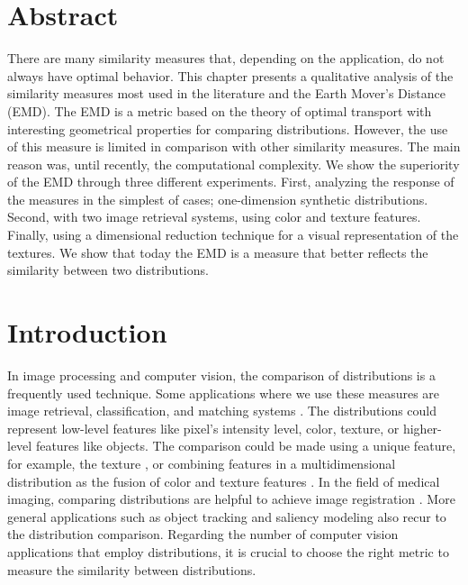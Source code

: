 \section*{Abstract}
\noindent There are many similarity measures that, depending on the application, do not always have optimal behavior. This chapter presents a qualitative analysis of the similarity measures most used in the literature and the Earth Mover's Distance (EMD). The EMD is a metric based on the theory of optimal transport with interesting geometrical properties for comparing distributions. However, the use of this measure is limited in comparison with other similarity measures. The main reason was, until recently, the computational complexity. We show the superiority of the EMD through three different experiments. First, analyzing the response of the measures in the simplest of cases; one-dimension synthetic distributions. Second, with two image retrieval systems, using color and texture features. Finally, using a dimensional reduction technique for a visual representation of the textures. We show that today the EMD is a measure that better reflects the similarity between two distributions.

\section{Introduction}\label{sec:introduction}
In image processing and computer vision, the comparison of distributions is a frequently used technique. Some applications where we use these measures are image retrieval, classification, and matching systems \citep{Smeulders.Worring.ea:PAMI:2000}. The distributions could represent low-level features like pixel's intensity level, color, texture, or higher-level features like objects. The comparison could be made using a unique feature, for example, the texture \citep{Banerjee.Bhunia.ea:ESWA:2018, Kwitt.Uhl:ICIP:2008}, or combining features in a multidimensional distribution as the fusion of color and texture features \citep{Liu.Guo.ea:IS:2017}. In the field of medical imaging, comparing distributions are helpful to achieve image registration \citep{So.Chung:JPR:2017}. More general applications such as object tracking \citep{Nejhum.Ho.ea:CVPR:2008, Klein.Frintrop:CV:2011} and  saliency modeling \citep{Bylinskii.Judd.ea:PAMI:2018} also recur to the distribution comparison. Regarding the number of computer vision applications that employ distributions, it is crucial to choose the right metric to measure the similarity between distributions.

